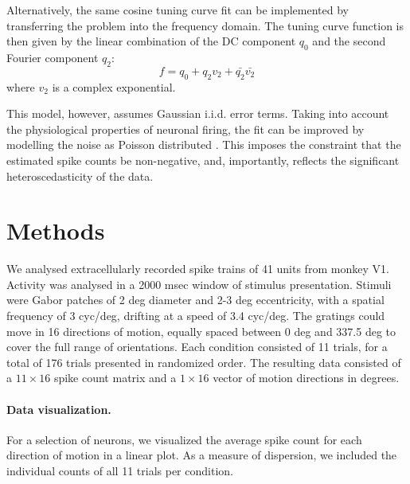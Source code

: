 \documentclass[10pt]{article}
\begin{document}
Alternatively, the same cosine tuning curve fit can be implemented by transferring the problem into the frequency domain. The tuning curve function is then given by the linear combination of the DC component $q_0$ and the second Fourier component $q_2$:
\begin{equation*}
f = q_0+q_2v_2+ \bar{q_2}\bar{v_2}
\end{equation*}
where $v_2$ is a complex exponential.

This model, however, assumes Gaussian i.i.d. error terms. Taking into account the physiological properties of neuronal firing, the fit can be improved by modelling the noise as Poisson distributed \cite{softky1993highly}. This imposes the constraint that the estimated spike counts be non-negative, and, importantly, reflects the significant heteroscedasticity of the data.


\section*{Methods}

We analysed extracellularly recorded spike trains of 41 units from monkey V1. Activity was analysed in a 2000 msec window of stimulus presentation. Stimuli were Gabor patches of 2 deg diameter and 2-3 deg eccentricity, with a spatial frequency of 3 cyc/deg, drifting at a speed of 3.4 cyc/deg. The gratings could move in 16 directions of motion, equally spaced between 0 deg and 337.5 deg to cover the full range of orientations. Each condition consisted of 11 trials, for a total of 176 trials presented in randomized order. The resulting data consisted of a $11\times16$ spike count matrix and a $1\times16$ vector of motion directions in degrees.

\paragraph{Data visualization.} For a selection of neurons, we visualized the average spike count for each direction of motion in a linear plot. As a measure of dispersion, we included the individual counts of all 11 trials per condition.
\end{document}
